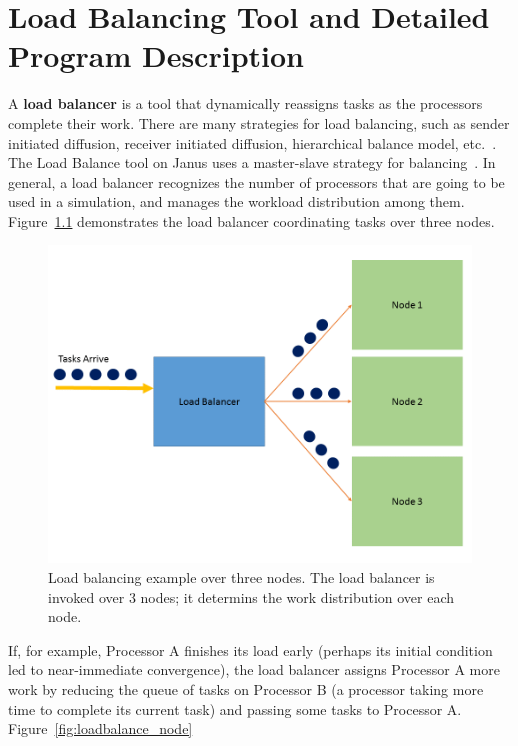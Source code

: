 \chapter{Load Balancing Tool and Detailed Program
  Description}\label{lbdetails}
A \textbf{load balancer} is a tool that dynamically reassigns tasks as the
processors complete their work. There are many strategies for load
balancing, such as sender initiated diffusion, receiver initiated
diffusion, hierarchical balance model, etc.~\cite{dlb}. The Load
Balance tool on Janus uses a master-slave strategy for
balancing~\cite{janus}. In general, a load balancer recognizes the
number of processors that are going to be used in a simulation, and manages
the workload distribution among
them. Figure~\ref{fig:loadbalance_overall} demonstrates the load
balancer coordinating tasks over three nodes. 
\begin{figure}[htp]
\caption[Load balancing example]{Load balancing example over
  three nodes. The load balancer is invoked over 3 nodes; it determins
the work distribution over each node.}\label{fig:loadbalance_overall}
	\begin{center}
          \includegraphics[scale=0.35]{figs/loadbalance_overall.png}
	\end{center}
\end{figure}
If, for example, Processor A finishes its load early
(perhaps its initial condition led to near-immediate convergence),
the load balancer assigns Processor A more work by reducing the
queue of tasks on Processor B (a processor taking more time to complete its
current task) and passing some tasks to Processor A. Figure~\ref{fig:loadbalance_node}
